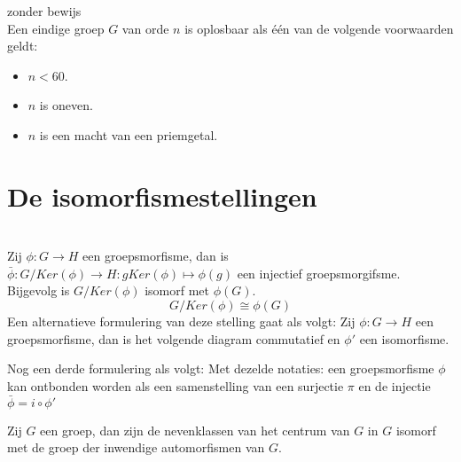 \documentclass[main.tex]{subfiles}
\begin{document}
\begin{st}
  zonder bewijs\\
  Een eindige groep $G$ van orde $n$ is oplosbaar als \'e\'en van de volgende voorwaarden geldt:
  \begin{itemize}
  \item $n < 60$.
  \item $n$ is oneven.
  \item $n$ is een macht van een priemgetal.
  \end{itemize}
\end{st}

\section{De isomorfismestellingen}
\label{sec:isomorfismestellingen}

\begin{st}
  \\
  Zij $\phi: G \rightarrow H$ een groepsmorfisme, dan is $\bar{\phi}: G/Ker(\phi) \rightarrow H: gKer(\phi) \mapsto \phi(g)$ een injectief groepsmorgifsme.
  Bijgevolg is $G/Ker(\phi)$ isomorf met $\phi(G)$.
  \[ G/Ker(\phi) \cong \phi(G) \]
  Een alternatieve formulering van deze stelling gaat als volgt:
  Zij $\phi: G \rightarrow H$ een groepsmorfisme, dan is het volgende diagram commutatief en $\phi'$ een isomorfisme.
  \begin{figure}[H]
    \centering
  \end{figure}
  Nog een derde formulering als volgt:
  Met dezelde notaties: een groepsmorfisme $\phi$ kan ontbonden worden als een samenstelling van een surjectie $\pi$ en de injectie $\bar{\phi} = i \circ \phi'$
\end{st}

\begin{pr}
  Zij $G$ een groep, dan zijn de nevenklassen van het centrum van $G$ in $G$ isomorf met de groep der inwendige automorfismen van $G$.
\end{pr}
\end{document}
